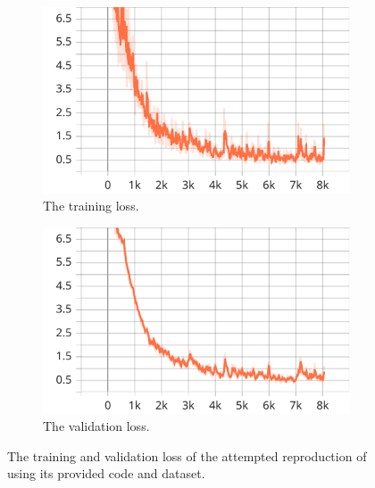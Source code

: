 \begin{figure}
    \centering
    \begin{subfigure}{.45\textwidth}
        \includegraphics[width=\textwidth]{graphics/work-artifacts/im2vec/114/loss.pdf}
        \caption{The training loss.}
    \end{subfigure}
    \begin{subfigure}{.45\textwidth}
        \includegraphics[width=\textwidth]{graphics/work-artifacts/im2vec/114/avg_val_loss.pdf}
        \caption{The validation loss.}
    \end{subfigure}
    \caption{The training and validation loss of the attempted reproduction of \citep{DBLP:conf/cvpr/Reddy21} using its provided code and dataset.}
    \label{fig:114.loss}
\end{figure}

